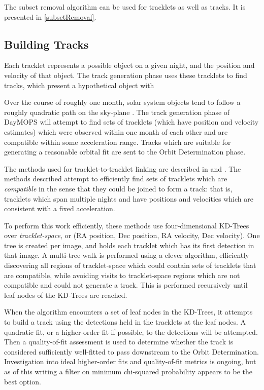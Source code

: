 The subset removal algorithm can be used for tracklets as well as
tracks.  It is presented in \ref{subsetRemoval}.




\subsection{Building Tracks}

Each tracklet represents a possible object on a given night, and the
position and velocity of that object.  The track generation phase uses
these tracklets to find tracks, which present a hypothetical object with 

Over the course of roughly one month, solar system objects tend to
follow a roughly quadratic path on the sky-plane
\citep{kubica_thesis}.  The track generation phase of DayMOPS will
attempt to find sets of tracklets (which have position and velocity
estimates) which were observed within one month of each other and are
compatible within some acceleration range.  Tracks which are
suitable for generating a reasonable orbital fit are sent to the Orbit
Determination phase.

The methods used for tracklet-to-tracklet linking are described in
\citet{kubica_thesis} and \citet{Kubica:2005:MTA:1081870.1081889}.
The methods described attempt to efficiently find sets of tracklets
which are \textit{compatible} in the sense that they could be joined
to form a track: that is, tracklets which span multiple nights and
have positions and velocities which are consistent with a fixed
acceleration.  

To perform this work efficiently, these methods use four-dimensional
KD-Trees over \textit{tracklet-space}, or (RA position, Dec position,
RA velocity, Dec velocity). One tree is created per image, and holds
each tracklet which has its first detection in that image.  A
multi-tree walk is performed using a clever algorithm, efficiently
discovering all regions of tracklet-space which could contain sets of
tracklets that are compatible, while avoiding visits to tracklet-space
regions which are not compatible and could not generate a track.  This
is performed recursively until leaf nodes of the KD-Trees are reached.


When the algorithm encounters a set of leaf nodes in the KD-Trees, it
attempts to build a track using the detections held in the tracklets
at the leaf nodes.  A quadratic fit, or a higher-order fit if
possible, to the detections will be attempted.  Then a quality-of-fit
assessment is used to determine whether the track is considered
sufficiently well-fitted to pass downstream to the Orbit
Determination.  Investigation into ideal higher-order fits and
quality-of-fit metrics is ongoing, but as of this writing a filter on
minimum chi-squared probability appears to be the best option.

